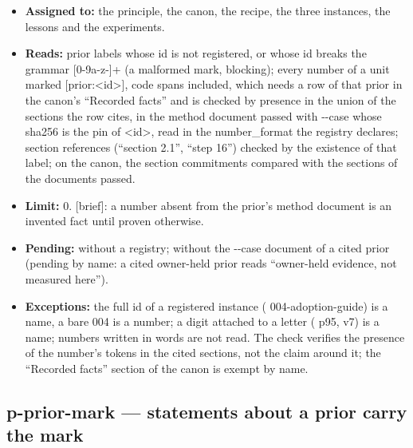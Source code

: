 \documentclass[
  american,
  10pt,
]{report}
\providecommand{\tightlist}{%
  \setlength{\itemsep}{0pt}\setlength{\parskip}{0pt}}
\renewcommand{\texttt}[1]{{\ttfamily\hyphenchar\font=-1 #1}}
\begin{document}
\begin{itemize}
\tightlist
\item
  \textbf{Assigned to:} the principle, the canon, the recipe, the three
  instances, the lessons and the experiments.
\item
  \textbf{Reads:} prior labels whose id is not registered, or whose id
  breaks the grammar
  \texttt{[0-\allowbreak{}9a-\allowbreak{}z-\allowbreak{}]+} (a
  malformed mark, blocking); every number of a unit marked
  \texttt{[prior:\allowbreak{}<id>]}, code spans included, which needs a
  row of that prior in the canon's ``Recorded facts'' and is checked by
  presence in the union of the sections the row cites, in the method
  document passed with \texttt{-\allowbreak{}-\allowbreak{}case} whose
  sha256 is the pin of \texttt{<id>}, read in the
  \texttt{number\_\allowbreak{}format} the registry declares; section
  references (``section 2.1'', ``step 16'') checked by the existence of
  that label; on the canon, the section commitments compared with the
  sections of the documents passed.
\item
  \textbf{Limit:} 0. \texttt{[brief]}: a number absent from the prior's
  method document is an invented fact until proven otherwise.
\item
  \textbf{Pending:} without a registry; without the
  \texttt{-\allowbreak{}-\allowbreak{}case} document of a cited prior
  (pending by name: a cited owner-held prior reads ``owner-held
  evidence, not measured here'').
\item
  \textbf{Exceptions:} the full id of a registered instance
  (\texttt{004-\allowbreak{}adoption-\allowbreak{}guide}) is a name, a
  bare \texttt{004} is a number; a digit attached to a letter
  (\texttt{p95}, \texttt{v7}) is a name; numbers written in words are
  not read. The check verifies the presence of the number's tokens in
  the cited sections, not the claim around it; the ``Recorded facts''
  section of the canon is exempt by name.
\end{itemize}

\subsection{\texorpdfstring{\texttt{p-\allowbreak{}prior-\allowbreak{}mark}
--- statements about a prior carry the
mark}{ --- statements about a prior carry the mark}}\label{p-prior-mark-statements-about-a-prior-carry-the-mark}
\end{document}
